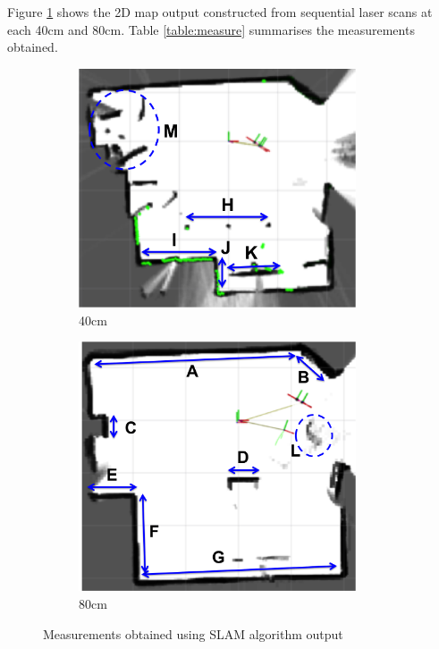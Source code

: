 \documentclass[capstone_report.tex]{subfiles}
\begin{document}
Figure \ref{fig:map_env_RVIZ} shows the 2D map output constructed from sequential laser scans at each 40cm and 80cm. Table \ref{table:measure} summarises the measurements obtained.

\begin{figure}[H]
    \centering
    \begin{subfigure}{0.5\textwidth}
        \centering
        \includegraphics[width=0.9\textwidth]{./imgs/mapping/an_map_40cm_arrows.png}
        \caption{40cm}
    \end{subfigure}%
    \begin{subfigure}{0.5\textwidth}
        \centering
        \includegraphics[width=0.9\textwidth]{./imgs/mapping/an_map_80cm_arrows.png}
        \caption{80cm}
    \end{subfigure}
    \caption{Measurements obtained using SLAM algorithm output}
    \label{fig:map_env_RVIZ}
\end{figure}
\end{document}
